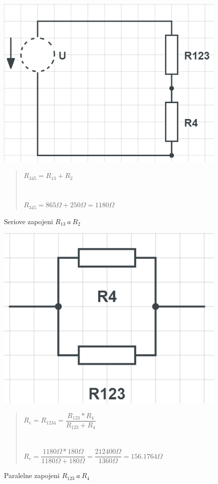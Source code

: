 \begin{figure}[H]
    \centering
    \includegraphics[scale=0.5]{pic2/u2o2.png}
    \caption{Seriove zapojeni $R_{13} \: a \: R_2$}
    \label{fig:Paralel_resistor_R123}
    \begin{quote}
    \centering
    $R_{345} = R_{13} + R_2$ \\~\\~\\
    $R_{345} = 865\Omega + 250\Omega = 1180\Omega$
    \end{quote}
\end{figure}

\begin{figure}[H]
    \centering
    \includegraphics[scale=0.5]{pic2/u2o3.png}
    \caption{Paralelne zapojeni $R_{123} \: a \: R_4$}
    \label{fig:Paralel_resistor_R1234}
    \begin{quote}
    \centering
    $R_e = R_{1234} = \dfrac{R_{123} * R_4}{R_{123} + R_4}$ \\~\\~\\
    $R_e = \dfrac{1180\Omega * 180\Omega}{1180\Omega + 180\Omega} = \dfrac{212 400\Omega}{1360\Omega} = 156.1764\Omega$
    \end{quote}
\end{figure}
